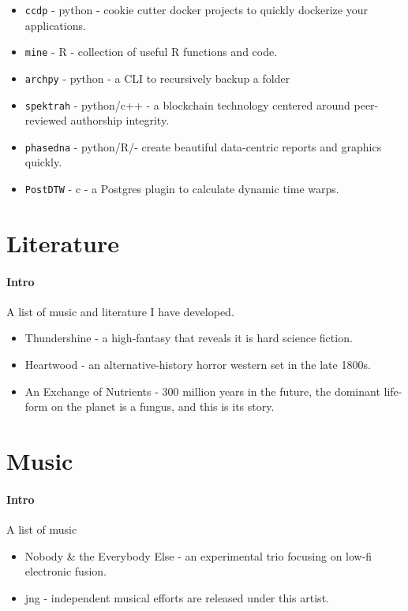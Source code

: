 \documentclass[10pt]{article}%
\begin{document}
\begin{itemize}
  \item \texttt{ccdp} - python - cookie cutter docker projects to quickly dockerize your applications.
  \item \texttt{mine} - R - collection of useful R functions and code.
  \item \texttt{archpy} - python - a CLI to recursively backup a folder
  \item \texttt{spektrah} - python/c++ - a blockchain technology centered around peer-reviewed authorship integrity.
  \item \texttt{phasedna} - python/R/\latex - create beautiful data-centric reports and graphics quickly.
  \item \texttt{PostDTW} - c - a Postgres plugin to calculate dynamic time warps.
\end{itemize}
\section{Literature}
\paragraph{Intro} A list of music and literature I have developed.
\begin{itemize}
  \item Thundershine - a high-fantasy that reveals it is hard science fiction.
  \item Heartwood - an alternative-history horror western set in the late 1800s.
  \item An Exchange of Nutrients - 300 million years in the future, the dominant life-form on the planet is a fungus, and this is its story.
\end{itemize}
\section{Music}
\paragraph{Intro} A list of music
\begin{itemize}
  \item Nobody \& the Everybody Else - an experimental trio focusing on low-fi electronic fusion.
  \item jng - independent musical efforts are released under this artist.
\end{itemize}
\end{document}
